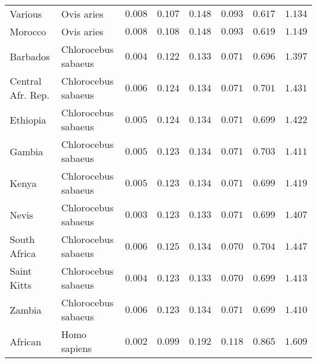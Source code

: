 \documentclass{article}
\begin{document}
\begin{center}
\begin{longtable*}{|l|l|r|r|r|r|r|r|}
            Various &          Ovis aries &               $ 0.008$ &                      $ 0.107$ &  $ 0.148$ &             $ 0.093$ &             $ 0.617$ &             $ 1.134$ \\
            Morocco &          Ovis aries &               $ 0.008$ &                      $ 0.108$ &  $ 0.148$ &             $ 0.093$ &             $ 0.619$ &             $ 1.149$ \\
            Barbados & Chlorocebus sabaeus &               $ 0.004$ &                      $ 0.122$ &  $ 0.133$ &             $ 0.071$ &             $ 0.696$ &             $ 1.397$ \\
            Central Afr. Rep. & Chlorocebus sabaeus &               $ 0.006$ &                      $ 0.124$ &  $ 0.134$ &             $ 0.071$ &             $ 0.701$ &             $ 1.431$ \\
            Ethiopia & Chlorocebus sabaeus &               $ 0.005$ &                      $ 0.124$ &  $ 0.134$ &             $ 0.071$ &             $ 0.699$ &             $ 1.422$ \\
            Gambia & Chlorocebus sabaeus &               $ 0.005$ &                      $ 0.123$ &  $ 0.134$ &             $ 0.071$ &             $ 0.703$ &             $ 1.411$ \\
            Kenya & Chlorocebus sabaeus &               $ 0.005$ &                      $ 0.123$ &  $ 0.134$ &             $ 0.071$ &             $ 0.699$ &             $ 1.419$ \\
            Nevis & Chlorocebus sabaeus &               $ 0.003$ &                      $ 0.123$ &  $ 0.133$ &             $ 0.071$ &             $ 0.699$ &             $ 1.407$ \\
            South Africa & Chlorocebus sabaeus &               $ 0.006$ &                      $ 0.125$ &  $ 0.134$ &             $ 0.070$ &             $ 0.704$ &             $ 1.447$ \\
            Saint Kitts & Chlorocebus sabaeus &               $ 0.004$ &                      $ 0.123$ &  $ 0.133$ &             $ 0.070$ &             $ 0.699$ &             $ 1.413$ \\
            Zambia & Chlorocebus sabaeus &               $ 0.006$ &                      $ 0.123$ &  $ 0.134$ &             $ 0.071$ &             $ 0.699$ &             $ 1.410$ \\
            African &        Homo sapiens &               $ 0.002$ &                      $ 0.099$ &  $ 0.192$ &             $ 0.118$ &             $ 0.865$ &             $ 1.609$ \\

\end{longtable*}
\end{center}
\end{document}
